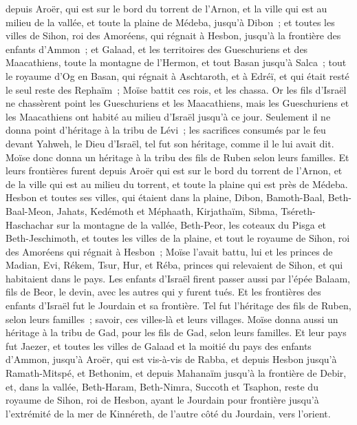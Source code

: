 \begin{multicols}{2}
depuis Aroër, qui est sur le bord du torrent de l'Arnon, et la ville qui est au milieu de la vallée, et toute la plaine de Médeba, jusqu'à Dibon~;
et toutes les villes de Sihon, roi des Amoréens, qui régnait à Hesbon, jusqu'à la frontière des enfants d'Ammon~;
et Galaad, et les territoires des Gueschuriens et des Maacathiens, toute la montagne de l'Hermon, et tout Basan jusqu'à Salca~;
tout le royaume d'Og en Basan, qui régnait à Aschtaroth, et à Edréï, et qui était resté le seul reste des Rephaïm~; Moïse battit ces rois, et les chassa.
Or les fils d'Israël ne chassèrent point les Gueschuriens et les Maacathiens, mais les Gueschuriens et les Maacathiens ont habité au milieu d'Israël jusqu'à ce jour.
Seulement il ne donna point d'héritage à la tribu de Lévi~; les sacrifices consumés par le feu devant Yahweh, le Dieu d'Israël, tel fut son héritage, comme il le lui avait dit.
Moïse donc donna un héritage à la tribu des fils de Ruben selon leurs familles.
Et leurs frontières furent depuis Aroër qui est sur le bord du torrent de l'Arnon, et de la ville qui est au milieu du torrent, et toute la plaine qui est près de Médeba.
Hesbon et toutes ses villes, qui étaient dans la plaine, Dibon, Bamoth-Baal, Beth-Baal-Meon,
Jahats, Kedémoth et Méphaath,
Kirjathaïm, Sibma, Tséreth-Haschachar sur la montagne de la vallée,
Beth-Peor, les coteaux du Pisga et Beth-Jeschimoth,
et toutes les villes de la plaine, et tout le royaume de Sihon, roi des Amoréens qui régnait à Hesbon~; Moïse l'avait battu, lui et les princes de Madian, Evi, Rékem, Tsur, Hur, et Réba, princes qui relevaient de Sihon, et qui habitaient dans le pays.
Les enfants d'Israël firent passer aussi par l'épée Balaam, fils de Beor, le devin, avec les autres qui y furent tués.
Et les frontières des enfants d'Israël fut le Jourdain et sa frontière. Tel fut l'héritage des fils de Ruben, selon leurs familles~; savoir, ces villes-là et leurs villages.
Moïse donna aussi un héritage à la tribu de Gad, pour les fils de Gad, selon leurs familles.
Et leur pays fut Jaezer, et toutes les villes de Galaad et la moitié du pays des enfants d'Ammon, jusqu'à Aroër, qui est vis-à-vis de Rabba,
et depuis Hesbon jusqu'à Ramath-Mitspé, et Bethonim, et depuis Mahanaïm jusqu'à la frontière de Debir,
et, dans la vallée, Beth-Haram, Beth-Nimra, Succoth et Tsaphon, reste du royaume de Sihon, roi de Hesbon, ayant le Jourdain pour frontière jusqu'à l'extrémité de la mer de Kinnéreth, de l'autre côté du Jourdain, vers l'orient.

\end{multicols}
